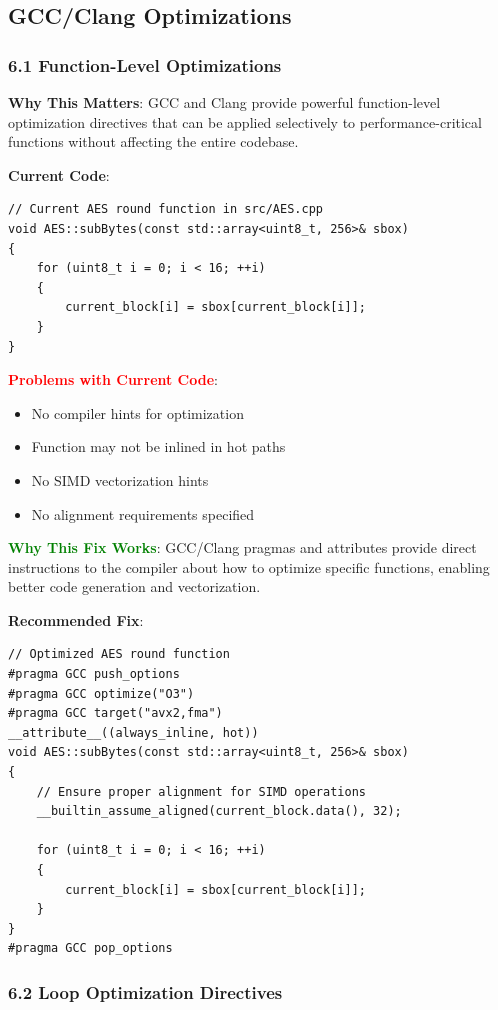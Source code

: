\documentclass[11pt,a4paper]{article}
\begin{document}
\subsection{GCC/Clang Optimizations}

\subsubsection{6.1 Function-Level Optimizations}

\textbf{Why This Matters}: GCC and Clang provide powerful function-level optimization directives that can be applied selectively to performance-critical functions without affecting the entire codebase.

\textbf{Current Code}:
\begin{lstlisting}
// Current AES round function in src/AES.cpp
void AES::subBytes(const std::array<uint8_t, 256>& sbox)
{
    for (uint8_t i = 0; i < 16; ++i)
    {
        current_block[i] = sbox[current_block[i]];
    }
}
\end{lstlisting}

\textcolor{red}{\textbf{Problems with Current Code}}:
\begin{itemize}
    \item No compiler hints for optimization
    \item Function may not be inlined in hot paths
    \item No SIMD vectorization hints
    \item No alignment requirements specified
\end{itemize}

\textcolor{green}{\textbf{Why This Fix Works}}: GCC/Clang pragmas and attributes provide direct instructions to the compiler about how to optimize specific functions, enabling better code generation and vectorization.

\textbf{Recommended Fix}:
\begin{lstlisting}
// Optimized AES round function
#pragma GCC push_options
#pragma GCC optimize("O3")
#pragma GCC target("avx2,fma")
__attribute__((always_inline, hot))
void AES::subBytes(const std::array<uint8_t, 256>& sbox)
{
    // Ensure proper alignment for SIMD operations
    __builtin_assume_aligned(current_block.data(), 32);
    
    for (uint8_t i = 0; i < 16; ++i)
    {
        current_block[i] = sbox[current_block[i]];
    }
}
#pragma GCC pop_options
\end{lstlisting}

\subsubsection{6.2 Loop Optimization Directives}
\end{document}
